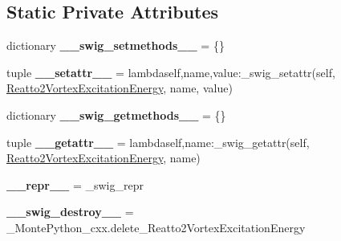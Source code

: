 \subsection*{Static Private Attributes}
\begin{DoxyCompactItemize}
\item 
\hypertarget{classMontePython__cxx_1_1Reatto2VortexExcitationEnergy_af8d8d4736a960f0277d912b3402b7344}{}dictionary {\bfseries \+\_\+\+\_\+swig\+\_\+setmethods\+\_\+\+\_\+} = \{\}\label{classMontePython__cxx_1_1Reatto2VortexExcitationEnergy_af8d8d4736a960f0277d912b3402b7344}

\item 
\hypertarget{classMontePython__cxx_1_1Reatto2VortexExcitationEnergy_ab40153bed3d933170bf7d90a611a6b37}{}tuple {\bfseries \+\_\+\+\_\+setattr\+\_\+\+\_\+} = lambdaself,name,value\+:\+\_\+swig\+\_\+setattr(self, \hyperlink{classMontePython__cxx_1_1Reatto2VortexExcitationEnergy}{Reatto2\+Vortex\+Excitation\+Energy}, name, value)\label{classMontePython__cxx_1_1Reatto2VortexExcitationEnergy_ab40153bed3d933170bf7d90a611a6b37}

\item 
\hypertarget{classMontePython__cxx_1_1Reatto2VortexExcitationEnergy_ad10ba97f9694120413d2fa6483e331ae}{}dictionary {\bfseries \+\_\+\+\_\+swig\+\_\+getmethods\+\_\+\+\_\+} = \{\}\label{classMontePython__cxx_1_1Reatto2VortexExcitationEnergy_ad10ba97f9694120413d2fa6483e331ae}

\item 
\hypertarget{classMontePython__cxx_1_1Reatto2VortexExcitationEnergy_ade62e4116e57963f7cd4348d7823b9ba}{}tuple {\bfseries \+\_\+\+\_\+getattr\+\_\+\+\_\+} = lambdaself,name\+:\+\_\+swig\+\_\+getattr(self, \hyperlink{classMontePython__cxx_1_1Reatto2VortexExcitationEnergy}{Reatto2\+Vortex\+Excitation\+Energy}, name)\label{classMontePython__cxx_1_1Reatto2VortexExcitationEnergy_ade62e4116e57963f7cd4348d7823b9ba}

\item 
\hypertarget{classMontePython__cxx_1_1Reatto2VortexExcitationEnergy_a9da43c4582013ac88e501742cb5fd9ce}{}{\bfseries \+\_\+\+\_\+repr\+\_\+\+\_\+} = \+\_\+swig\+\_\+repr\label{classMontePython__cxx_1_1Reatto2VortexExcitationEnergy_a9da43c4582013ac88e501742cb5fd9ce}

\item 
\hypertarget{classMontePython__cxx_1_1Reatto2VortexExcitationEnergy_aef95a9fd91f395e52b781a23e0d898c1}{}{\bfseries \+\_\+\+\_\+swig\+\_\+destroy\+\_\+\+\_\+} = \+\_\+\+Monte\+Python\+\_\+cxx.\+delete\+\_\+\+Reatto2\+Vortex\+Excitation\+Energy\label{classMontePython__cxx_1_1Reatto2VortexExcitationEnergy_aef95a9fd91f395e52b781a23e0d898c1}

\end{DoxyCompactItemize}


